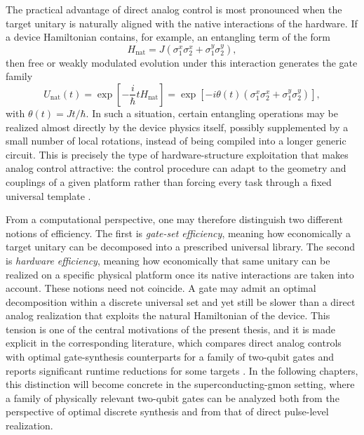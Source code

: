 The practical advantage of direct analog control is most pronounced when the target unitary is naturally aligned with the native interactions of the hardware. If a device Hamiltonian contains, for example, an entangling term of the form
\begin{equation}
H_{\mathrm{nat}}
=
J \left( \sigma_{1}^{x}\sigma_{2}^{x} + \sigma_{1}^{y}\sigma_{2}^{y} \right),
\label{eq:native_entangling_hamiltonian}
\end{equation}
then free or weakly modulated evolution under this interaction generates the gate family
\begin{equation}
U_{\mathrm{nat}}(t)
=
\exp\!\left[
-\frac{i}{\hbar} t H_{\mathrm{nat}}
\right]
=
\exp\!\left[
-i \theta(t)\left(\sigma_{1}^{x}\sigma_{2}^{x}+\sigma_{1}^{y}\sigma_{2}^{y}\right)
\right],
\label{eq:native_gate_family}
\end{equation}
with $\theta(t)=Jt/\hbar$. In such a situation, certain entangling operations may be realized almost directly by the device physics itself, possibly supplemented by a small number of local rotations, instead of being compiled into a longer generic circuit. This is precisely the type of hardware-structure exploitation that makes analog control attractive: the control procedure can adapt to the geometry and couplings of a given platform rather than forcing every task through a fixed universal template \cite{Koch2022,DAlessandro2007}.

From a computational perspective, one may therefore distinguish two different notions of efficiency. The first is \emph{gate-set efficiency}, meaning how economically a target unitary can be decomposed into a prescribed universal library. The second is \emph{hardware efficiency}, meaning how economically that same unitary can be realized on a specific physical platform once its native interactions are taken into account. These notions need not coincide. A gate may admit an optimal decomposition within a discrete universal set and yet still be slower than a direct analog realization that exploits the natural Hamiltonian of the device. This tension is one of the central motivations of the present thesis, and it is made explicit in the corresponding literature, which compares direct analog controls with optimal gate-synthesis counterparts for a family of two-qubit gates and reports significant runtime reductions for some targets \cite{Niu2019}. In the following chapters, this distinction will become concrete in the superconducting-gmon setting, where a family of physically relevant two-qubit gates can be analyzed both from the perspective of optimal discrete synthesis and from that of direct pulse-level realization.


